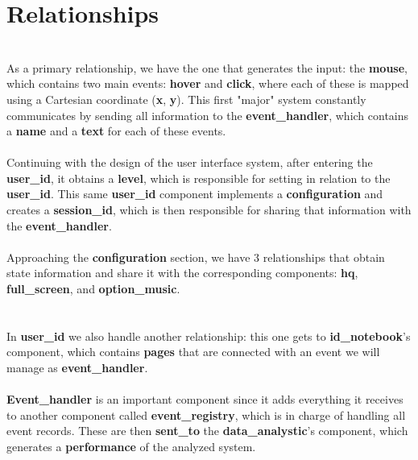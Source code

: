 \documentclass{article}
\begin{document}
\section*{Relationships}

\\
As a primary relationship, we have the one that generates the input: the \textbf{\textbf{mouse}}, 
which contains two main events: \textbf{\textbf{hover}} and \textbf{\textbf{click}}, where each 
of these is mapped using a Cartesian coordinate (\textbf{\textbf{x}}, \textbf{\textbf{y}}). This 
first "major" system constantly communicates by sending all information 
to the \textbf{\textbf{event\_handler}}, which contains a \textbf{\textbf{name}} and 
a \textbf{\textbf{text}} for each of these events.
\\
\\
Continuing with the design of the user interface system, after entering the
 \textbf{\textbf{user\_id}}, it obtains a \textbf{\textbf{level}}, which is responsible for 
 setting in relation to the \textbf{\textbf{user\_id}}. This same \textbf{\textbf{user\_id}} 
 component implements a \textbf{\textbf{configuration}} and creates a \textbf{\textbf{session\_id}},
  which is then responsible for sharing that information with the \textbf{\textbf{event\_handler}}.
  \\
  \\
Approaching the \textbf{\textbf{configuration}} section, we have 3 relationships that obtain state
 information and share it with the corresponding components: \textbf{\textbf{hq}},
  \textbf{\textbf{full\_screen}}, and \textbf{\textbf{option\_music}}. 
  \\
 \\
 \\
In \textbf{\textbf{user\_id}} we also handle another relationship: this one gets to 
\textbf{\textbf{id\_notebook}}’s component, which contains \textbf{\textbf{pages}} 
that are connected with an event we will manage as \textbf{\textbf{event\_handler}}.
\\
\\
\textbf{\textbf{Event\_handler}} is an important component since it adds everything it receives 
to another component called \textbf{\textbf{event\_registry}}, which is in charge of handling all 
event records. These are then \textbf{\textbf{sent\_to}} the \textbf{\textbf{data\_analystic}}’s 
component, which generates a \textbf{\textbf{performance}} of the analyzed system.
\end{document}
